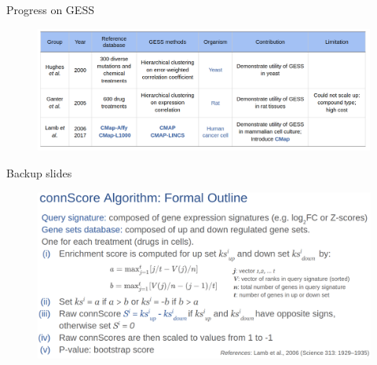 \documentclass[10pt]{beamer}
\begin{document}
\begin{frame}[fragile]{Progress on GESS}
\vspace{-1cm}
\begin{figure}
    \includegraphics[width=11.2cm]{demo/images/progress_gess.png}
\end{figure}
\end{frame}
\begin{frame}[fragile]{Backup slides}
    \begin{figure}
        \includegraphics[width=12cm]{demo/images/connScore_algo.png}
    \end{figure}
\end{frame}
\end{document}
